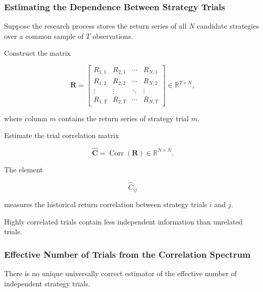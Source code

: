 \documentclass[11pt,a4paper]{article}
\begin{document}
\subsubsection{Estimating the Dependence Between Strategy Trials}

Suppose the research process stores the return series of all $N$ candidate
strategies over a common sample of $T$ observations.

Construct the matrix

\begin{equation}
\mathbf{R}
=
\begin{bmatrix}
R_{1,1} & R_{2,1} & \cdots & R_{N,1}
\\
R_{1,2} & R_{2,2} & \cdots & R_{N,2}
\\
\vdots & \vdots & \ddots & \vdots
\\
R_{1,T} & R_{2,T} & \cdots & R_{N,T}
\end{bmatrix}
\in
\mathbb{R}^{T\times N},
\end{equation}

where column $m$ contains the return series of strategy trial $m$.

Estimate the trial correlation matrix

\begin{equation}
\boxed{
\widehat{\mathbf{C}}
=
\operatorname{Corr}
\left(
\mathbf{R}
\right)
\in
\mathbb{R}^{N\times N}.
}
\end{equation}

The element

\begin{equation}
\widehat{C}_{ij}
\end{equation}

measures the historical return correlation between strategy trials $i$ and $j$.

Highly correlated trials contain less independent information than unrelated
trials.


\subsubsection{Effective Number of Trials from the Correlation Spectrum}

There is no unique universally correct estimator of the effective number of
independent strategy trials.
\end{document}
